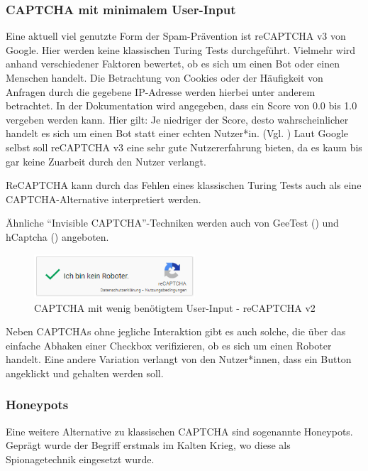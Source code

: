 \subsubsection*{CAPTCHA mit minimalem User-Input}
Eine aktuell viel genutzte Form der Spam-Prävention ist reCAPTCHA v3 von Google. 
Hier werden keine klassischen Turing Tests durchgeführt. 
Vielmehr wird anhand verschiedener Faktoren bewertet, ob es sich um einen Bot oder einen Menschen handelt.
Die Betrachtung von Cookies oder der Häufigkeit von Anfragen durch die gegebene IP-Adresse werden hierbei unter anderem betrachtet.
In der Dokumentation wird angegeben, dass ein Score von 0.0 bis 1.0 vergeben werden kann. 
Hier gilt: Je niedriger der Score, desto wahrscheinlicher handelt es sich um einen Bot statt einer echten Nutzer*in. (Vgl. \cite{recaptchadoc})
Laut Google selbst soll reCAPTCHA v3 eine sehr gute Nutzererfahrung bieten, da es kaum bis gar keine Zuarbeit durch den Nutzer verlangt. \cite{googleblog:recaptcha}

ReCAPTCHA kann durch das Fehlen eines klassischen Turing Tests auch als eine CAPTCHA-Alternative interpretiert werden.

Ähnliche ``Invisible CAPTCHA''-Techniken werden auch von GeeTest \linebreak(\cite{geetest}) und hCaptcha (\cite{hcaptcha}) angeboten.

\begin{figure}[h!]
    \centering\includegraphics[width=6cm]{gfx/mygraphics/recaptcha.png}
     \caption{CAPTCHA mit wenig benötigtem User-Input - reCAPTCHA v2}
      \label{fig:recaptcha}
\end{figure}

\pagebreak

Neben CAPTCHAs ohne jegliche Interaktion gibt es auch solche, 
die über das einfache Abhaken einer Checkbox verifizieren, ob es sich um einen Roboter handelt.
Eine andere Variation verlangt von den Nutzer*innen, dass ein Button angeklickt und gehalten werden soll. 

\subsubsection*{Honeypots}
Eine weitere Alternative zu klassischen CAPTCHA sind sogenannte Honeypots. 
Geprägt wurde der Begriff erstmals im Kalten Krieg, wo diese als Spionagetechnik eingesetzt wurde. \cite[p.2]{joshi:2011} 

